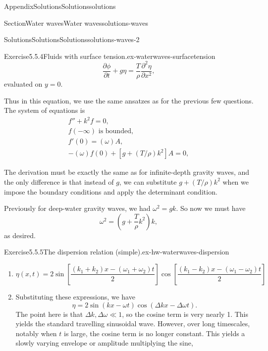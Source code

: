 \documentclass[oneside,10pt,]{book}
\numberwithin{equation}{section}
\newcommand{\pd}[2]{\frac{\partial#1}{\partial#2}}
\begin{document}
\begin{appendixptx}{Appendix}{Solutions}{}{Solutions}{}{}{solutions}
\begin{sectionptx}{Section}{Water waves}{}{Water waves}{}{}{solutions-waves}
\begin{solutions-subsection-numberless}{Solutions}{Solutions}{}{Solutions}{}{}{solutions-waves-2}
\begin{divisionsolution}{Exercise}{5.5.4}{Fluids with surface tension.}{ex-waterwaves-surfacetension}
\begin{equation*}
\pd{\phi}{t} + g\eta = \frac{T}{\rho} \pd{^2 \eta}{x^2}, 
\end{equation*}
evaluated on \(y = 0\).%
\par
Thus in this equation, we use the same ansatzes as for the previous few questions. The system of equations is%
\begin{gather*}
f'' + k^2 f = 0, \\
f(-\infty) \text{ is bounded}, \\
f'(0) = (\omega)A, \\
-(\omega) f(0) + [g + (T/\rho)k^2] A = 0, 
\end{gather*}
%
\par
The derivation must be exactly the same as for infinite-depth gravity waves, and the only difference is that instead of \(g\), we can substitute \(g + (T/\rho)k^2\) when we impose the boundary conditions and apply the determinant condition.%
\par
Previously for deep-water gravity waves, we had \(\omega^2 = gk\). So now we must have%
\begin{equation*}
\omega^2 = \left(g + \frac{T}{\rho} k^2\right) k,
\end{equation*}
as desired.%
\end{divisionsolution}%
\begin{divisionsolution}{Exercise}{5.5.5}{The dispersion relation (simple).}{ex-hw-waterwaves-dispersion}%
\begin{enumerate}[font=\bfseries,label=(\alph*),ref=\alph*]%
\item[(a)]\noindent\hypertarget{ex-hw-waterwaves-dispersion-3-2-main}{}%
\begin{equation*}
\eta(x, t) = 2\sin \left[ \frac{(k_1 + k_2)x - (\omega_1 + \omega_2)t}{2}\right]
\cos \left[ \frac{(k_1 - k_2)x - (\omega_1 - \omega_2)t}{2}\right]
\end{equation*}
%
\item[(b)]\noindent\hypertarget{ex-hw-waterwaves-dispersion-4-2-main}{}Substituting these expressions, we have%
\begin{equation*}
\eta = 2\sin(kx - \omega t)\cos(\Delta k x - \Delta \omega t).
\end{equation*}
The point here is that \(\Delta k, \Delta \omega \ll 1\), so the cosine term is very nearly 1. This yields the standard travelling sinusoidal wave. However, over long timescales, notably when \(t\) is large, the cosine term is no longer constant. This yields a slowly varying envelope or amplitude multiplying the sine,%

\end{enumerate}
\end{divisionsolution}
\end{solutions-subsection-numberless}
\end{sectionptx}
\end{appendixptx}
\end{document}
